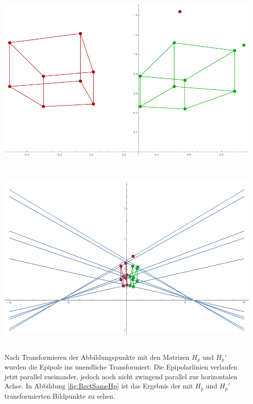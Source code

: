 \begin{minipage}{\linewidth}
	\centering
	\includegraphics[width=.8\linewidth]{images/Rectification_one_same_Solutions.png}
	\label{fig:RectOriginal} 
\end{minipage}\\ 

\begin{minipage}{\linewidth}
	\centering
	\includegraphics[width=.8\linewidth]{images/Rectification_two_same_Solutions.png}
	\label{fig:RectOriginalELines}
\end{minipage}\\


Nach Transformieren der Abbildungspunkte mit den Matrizen $H_p$ und $H_p'$ wurden die Epipole ins unendliche Transformiert. Die Epipolarlinien verlaufen jetzt parallel zueinander, jedoch noch nicht zwingend parallel zur horizontalen Achse. In Abbildung \ref{fig:RectSameHp} ist das Ergebnis der mit $H_p$ und $H_p'$ transformierten Bildpunkte zu sehen.


